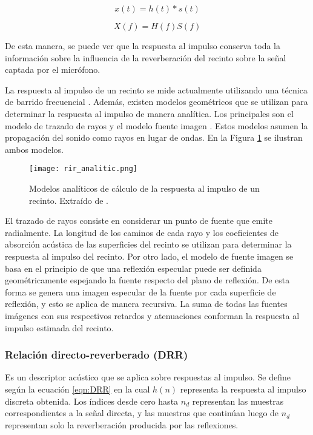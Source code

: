 \begin{equation}
\label{eqn:impulso}
	x(t) = h(t) * s(t)
\end{equation} 

\begin{equation}
\label{eqn:frecuencia}
	X(f) = H(f)S(f)
\end{equation} 

De esta manera, se puede ver que la respuesta al impulso conserva toda la información sobre la influencia de la reverberación del recinto sobre la señal captada por el micrófono. 

La respuesta al impulso de un recinto se mide actualmente utilizando una técnica de barrido frecuencial \cite{sinesweep}. Además, existen modelos geométricos que se utilizan para determinar la respuesta al impulso de manera analítica. Los principales son el modelo de trazado de rayos \cite{raytracing} y el modelo fuente imagen \cite{sourceimage}. Estos modelos asumen la propagación del sonido como rayos en lugar de ondas. En la Figura \ref{fig:analitic_rir} se ilustran ambos modelos. 

\begin{figure}[H]
  \centering{}
  \texttt{[image: rir\_analitic.png]}
  \caption{Modelos analíticos de cálculo de la respuesta al impulso de un recinto. Extraído de \cite{rir}.}
  \label{fig:analitic_rir}
\end{figure} 

El trazado de rayos consiste en considerar un punto de fuente que emite radialmente. La longitud de los caminos de cada rayo y los coeficientes de absorción acústica de las superficies del recinto se utilizan para determinar la respuesta al impulso del recinto. Por otro lado, el modelo de fuente imagen se basa en el principio de que una reflexión especular puede ser definida geométricamente espejando la fuente respecto del plano de reflexión. De esta forma se genera una imagen especular de la fuente por cada superficie de reflexión, y esto se aplica de manera recursiva. La suma de todas las fuentes imágenes con sus respectivos retardos y atenuaciones conforman la respuesta al impulso estimada del recinto.



\subsubsection{Relación directo-reverberado (DRR)}

Es un descriptor acústico que se aplica sobre respuestas al impulso. Se define según la ecuación \ref{eqn:DRR} en la cual $h(n)$ representa la respuesta al impulso discreta obtenida. Los índices desde cero hasta $n_{d}$ representan las muestras correspondientes a la señal directa, y las muestras que continúan luego de $n_{d}$ representan solo la reverberación producida por las reflexiones. 

